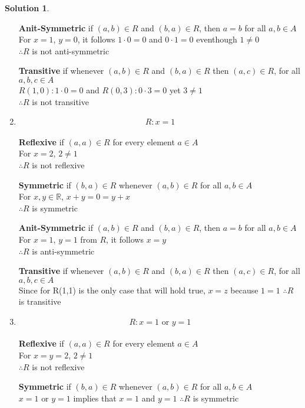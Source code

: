 \documentclass{article}
\theoremstyle{definition}
\newtheorem*{solution}{Solution}
\begin{document}
\begin{solution}
\begin{enumerate}[label=(\alph*)]
      \textbf{Anit-Symmetric} if $(a,b) \in R$ and $(b,a) \in R$, then $a=b$ for all $a,b \in A$ \\
      For $x=1$, $y=0$, it follows $1 \cdot 0 = 0$ and $0 \cdot 1 = 0$ eventhough $1 \neq 0$\\
      $\therefore R$ is not anti-symmetric 
    
      \textbf{Transitive} if whenever $(a,b) \in R$ and $(b,a) \in R$ then $(a,c) \in R$, for all $a,b,c \in A$ \\
      $R(1,0): 1 \cdot 0 = 0$ and $R(0,3): 0 \cdot 3 = 0$ yet $3 \neq 1$ \\
      $\therefore R$ is not transitive

    \item $$ R: x = 1$$ \\
  
      \textbf{Reflexive} if $(a,a) \in R$ for every element $a \in A$ \\
      For $x = 2$, $2 \neq 1$ \\
      $\therefore R$ is not reflexive
    
      \textbf{Symmetric} if $(b,a) \in R$ whenever $(a,b) \in R$ for all $a,b \in A$ \\
      For $x,y \in \mathbb{R}$, $ x+ y = 0 = y + x$ \\
      $\therefore R$ is symmetric
    
      \textbf{Anit-Symmetric} if $(a,b) \in R$ and $(b,a) \in R$, then $a=b$ for all $a,b \in A$ \\
      For $x=1$, $y=1$ from $R$, it follows $x = y$\\
      $\therefore R$ is anti-symmetric 
    
      \textbf{Transitive} if whenever $(a,b) \in R$ and $(b,a) \in R$ then $(a,c) \in R$, for all $a,b,c \in A$ \\
      Since for R(1,1) is the only case that will hold true, $x = z$ because $ 1 = 1$
      $\therefore R$ is transitive

    \item $$ R: x = 1 \text{ or } y = 1$$ \\
  
      \textbf{Reflexive} if $(a,a) \in R$ for every element $a \in A$ \\
      For $x = y = 2$, $2 \neq 1$ \\
      $\therefore R$ is not reflexive
    
      \textbf{Symmetric} if $(b,a) \in R$ whenever $(a,b) \in R$ for all $a,b \in A$ \\
       $x = 1 \text{ or } y = 1$ implies that $x=1$ and $y=1$ 
      $\therefore R$ is symmetric
    

\end{enumerate}
\end{solution}
\end{document}
